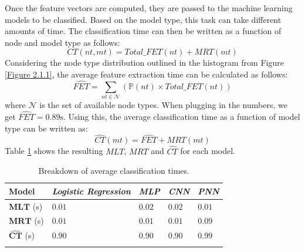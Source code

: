			Once the feature vectors are computed, they are passed to the machine learning models to be classified. Based on the model type, this task can take different amounts of time. The classification time can then be written as a function of node and model type as follows: 
			\begin{equation}
				CT(nt, mt) = Total\_FET(nt) + MRT(mt)
			\end{equation}
			Considering the node type distribution outlined in the histogram from Figure \ref{Figure 2.1.1}, the average feature extraction time can be calculated as follows:
			\begin{equation}
				\hat{FET} = \sum_{nt\in \mathbf{\mathcal{N}}} (\mathbb{P}(nt) \times Total\_FET(nt))
			\end{equation} 
			where $\mathcal{N}$ is the set of available node types. When plugging in the numbers, we get $\hat{FET} = 0.89\text{s}$. Using this, the average classification time as a function of model type can be written as: 
			\begin{equation}
				\hat{CT}(mt) =  \hat{FET} + MRT(mt) 
			\end{equation}  
			 Table \ref{Table: eval/service-time/classification/CT} shows the resulting $MLT$, $MRT$  and $\hat{CT}$ for each model.
			
			\begin{longtable}{|p{.15\textwidth}||p{}|p{}|p{}|p{}|}
				\textbf{Model} & \textit{Logistic Regression} & \textit{MLP} & \textit{CNN} & \textit{PNN} \\
				\hline
				$\mathbf{MLT}$ (s) & $0.01$ & $0.02$ & $0.02$ & $0.01$  \\
				\hline
				$\mathbf{MRT}$ (s) & $0.01$ &$0.01$ & $0.01$ & $0.09$ \\
				\hline\hline
				$\mathbf{\hat{CT}}$ (s) & $\mathbf{0.90}$ & $\mathbf{0.90}$ & $\mathbf{0.90}$ & $\mathbf{0.99}$ \\
				\hline
				\caption{Breakdown of average classification times.}
				\label{Table: eval/service-time/classification/CT}
			\end{longtable} 
			
